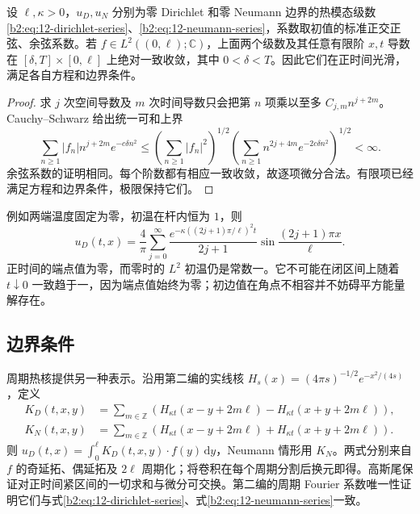 \begin{proposition}[正时间的经典解]\label{b2:prop:12-interval-smooth}
设 \(\ell,\kappa>0\)，\(u_D,u_N\) 分别为零 Dirichlet 和零 Neumann 边界的热模态级数\eqref{b2:eq:12-dirichlet-series}、\eqref{b2:eq:12-neumann-series}，系数取初值的标准正交正弦、余弦系数。若 \(f\in L^2((0,\ell);\mathbb C)\)，上面两个级数及其任意有限阶 \(x,t\) 导数在 \([\delta,T]\times[0,\ell]\) 上绝对一致收敛，其中 \(0<\delta<T\)。因此它们在正时间光滑，满足各自方程和边界条件。
\end{proposition}
\begin{proof}
求 \(j\) 次空间导数及 \(m\) 次时间导数只会把第 \(n\) 项乘以至多 \(C_{j,m}n^{j+2m}\)。Cauchy--Schwarz 给出统一可和上界
\[
 \sum_{n\geq1}|f_n|n^{j+2m}e^{-c\delta n^2}
 \leq\left(\sum_{n\geq1}|f_n|^2\right)^{1/2}
 \left(\sum_{n\geq1}n^{2j+4m}e^{-2c\delta n^2}\right)^{1/2}<\infty.
\]
余弦系数的证明相同。每个阶数都有相应一致收敛，故逐项微分合法。有限项已经满足方程和边界条件，极限保持它们。
\end{proof}

例如两端温度固定为零，初温在杆内恒为 \(1\)，则
\[
 u_D(t,x)=\dfrac4\pi\sum_{j=0}^{\infty}
 \dfrac{e^{-\kappa((2j+1)\pi/\ell)^2t}}{2j+1}
 \sin\dfrac{(2j+1)\pi x}{\ell}.
\]
正时间的端点值为零，而零时的 \(L^2\) 初温仍是常数一。它不可能在闭区间上随着 \(t\downarrow0\) 一致趋于一，因为端点值始终为零；初边值在角点不相容并不妨碍平方能量解存在。

\subsection{边界条件}
\label{b2:subsec:120103}

周期热核提供另一种表示。沿用第二编的实线核 \(H_s(x)=(4\pi s)^{-1/2}e^{-x^2/(4s)}\)，定义
\begin{align*}
 K_D(t,x,y)&=\sum_{m\in\mathbb Z}
 \left(H_{\kappa t}(x-y+2m\ell)-H_{\kappa t}(x+y+2m\ell)\right),\\
 K_N(t,x,y)&=\sum_{m\in\mathbb Z}
 \left(H_{\kappa t}(x-y+2m\ell)+H_{\kappa t}(x+y+2m\ell)\right).
\end{align*}
则 \(u_D(t,x)=\int_0^\ell K_D(t,x,y)\cdot f(y)\,\mathrm{d}y\)，Neumann 情形用 \(K_N\)。两式分别来自 \(f\) 的奇延拓、偶延拓及 \(2\ell\) 周期化；将卷积在每个周期分割后换元即得。高斯尾保证对正时间紧区间的一切求和与微分可交换。第二编的周期 Fourier 系数唯一性证明它们与式\eqref{b2:eq:12-dirichlet-series}、式\eqref{b2:eq:12-neumann-series}一致。

\ProseParagraphBreak

